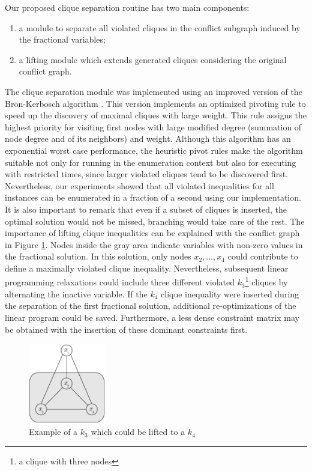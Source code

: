\documentclass{endm}
\begin{document}
Our proposed clique separation routine has two main components:  \begin{enumerate} \item a module to separate all violated cliques in the conflict subgraph induced by the fractional variables; \item a lifting module which extends generated cliques considering the original conflict graph. \end{enumerate}  The clique separation module was implemented using an improved version of the Bron-Kerbosch algorithm \cite{Bron1973}. This version implements an optimized pivoting rule \cite{Brito2011} to speed up the discovery of maximal cliques with large weight. This rule assigns the highest priority for visiting first nodes with large modified degree (summation of node degree and of its neighbors) and weight. Although this algorithm has an exponential worst case performance, the heuristic pivot rules  make the algorithm suitable not only for running in the enumeration context but also for executing with restricted times, since larger violated cliques tend to be discovered first. Nevertheless, our experiments showed that all violated inequalities for all instances can be enumerated in a fraction of a second using our implementation. It is also important to remark that even if a subset of cliques is inserted, the optimal solution would not be missed, branching would take care of the rest.  The importance of lifting clique inequalities can be explained with the conflict graph in Figure \ref{figClique}. Nodes inside the gray area indicate variables with non-zero values in the fractional solution. In this solution, only nodes $x_{2},\ldots,x_{4}$ could contribute to define a maximally violated clique inequality. Nevertheless, subsequent linear programming relaxations could include three different violated $k_{3}$\footnote{a clique with three nodes} cliques by alternating the inactive variable. If the $k_{4}$ clique inequality were inserted during the separation of the first fractional solution, additional re-optimizations of the linear program could be saved. Furthermore, a less dense constraint matrix may be obtained with the insertion of these dominant constraints first.

\begin{figure}
\begin{center}
	\includegraphics[width=0.3\textwidth]{clique.pdf}
	\caption{Example of a $k_{3}$ which could be lifted to a $k_{4}$ } \label{figClique}
\end{center}
\end{figure}
\end{document}
